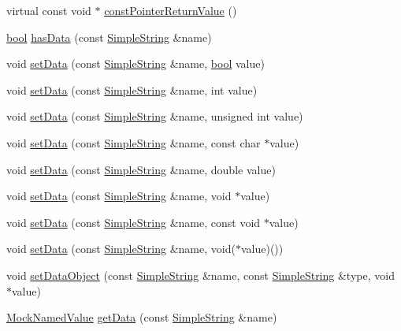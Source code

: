 \begin{DoxyCompactItemize}
\item 
virtual const void $\ast$ \hyperlink{class_mock_support_aebe262a9d0ae17c53b0ae751e15597d7}{const\+Pointer\+Return\+Value} ()
\item 
\hyperlink{avb__gptp_8h_af6a258d8f3ee5206d682d799316314b1}{bool} \hyperlink{class_mock_support_a10272444b06c9b8d32bd41d50575d396}{has\+Data} (const \hyperlink{class_simple_string}{Simple\+String} \&name)
\item 
void \hyperlink{class_mock_support_ae043bf1edf89cbc67bb4701b12c55ffc}{set\+Data} (const \hyperlink{class_simple_string}{Simple\+String} \&name, \hyperlink{avb__gptp_8h_af6a258d8f3ee5206d682d799316314b1}{bool} value)
\item 
void \hyperlink{class_mock_support_a84f97bb1c12a0f8b29efa01f9824bfe7}{set\+Data} (const \hyperlink{class_simple_string}{Simple\+String} \&name, int value)
\item 
void \hyperlink{class_mock_support_a3a53be72f79124935c371cc28888ee01}{set\+Data} (const \hyperlink{class_simple_string}{Simple\+String} \&name, unsigned int value)
\item 
void \hyperlink{class_mock_support_a185ba0a1b69e8338065b53279d6cf5ab}{set\+Data} (const \hyperlink{class_simple_string}{Simple\+String} \&name, const char $\ast$value)
\item 
void \hyperlink{class_mock_support_ac9d5364e7fbf2fc9b041d16ee0a26476}{set\+Data} (const \hyperlink{class_simple_string}{Simple\+String} \&name, double value)
\item 
void \hyperlink{class_mock_support_a969727abfd71a4e379a417dd860051e9}{set\+Data} (const \hyperlink{class_simple_string}{Simple\+String} \&name, void $\ast$value)
\item 
void \hyperlink{class_mock_support_a3b080388a1ec80f85dce5b846dd44a9b}{set\+Data} (const \hyperlink{class_simple_string}{Simple\+String} \&name, const void $\ast$value)
\item 
void \hyperlink{class_mock_support_aff6bf0a7e8d3d12ee718d8dddd6c58d7}{set\+Data} (const \hyperlink{class_simple_string}{Simple\+String} \&name, void($\ast$value)())
\item 
void \hyperlink{class_mock_support_a7ce6bf5b39ce367f9f6ee1be9fdee3c0}{set\+Data\+Object} (const \hyperlink{class_simple_string}{Simple\+String} \&name, const \hyperlink{class_simple_string}{Simple\+String} \&type, void $\ast$value)
\item 
\hyperlink{class_mock_named_value}{Mock\+Named\+Value} \hyperlink{class_mock_support_a541dfcf28b8737a8a6bb7b548594c9a4}{get\+Data} (const \hyperlink{class_simple_string}{Simple\+String} \&name)

\end{DoxyCompactItemize}

